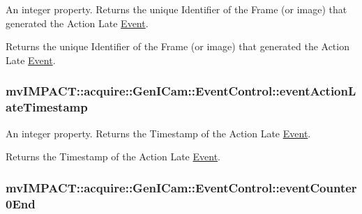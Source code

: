 An integer property. Returns the unique Identifier of the Frame (or image) that generated the Action Late \hyperlink{classmv_i_m_p_a_c_t_1_1acquire_1_1_event}{Event}. 

Returns the unique Identifier of the Frame (or image) that generated the Action Late \hyperlink{classmv_i_m_p_a_c_t_1_1acquire_1_1_event}{Event}. \hypertarget{classmv_i_m_p_a_c_t_1_1acquire_1_1_gen_i_cam_1_1_event_control_a7a4db5a663faf71da66e079f684392aa}{
\subsubsection[{event\+Action\+Late\+Timestamp}]{ mv\+I\+M\+P\+A\+C\+T\+::acquire\+::\+Gen\+I\+Cam\+::\+Event\+Control\+::event\+Action\+Late\+Timestamp}}\label{classmv_i_m_p_a_c_t_1_1acquire_1_1_gen_i_cam_1_1_event_control_a7a4db5a663faf71da66e079f684392aa}


An integer property. Returns the Timestamp of the Action Late \hyperlink{classmv_i_m_p_a_c_t_1_1acquire_1_1_event}{Event}. 

Returns the Timestamp of the Action Late \hyperlink{classmv_i_m_p_a_c_t_1_1acquire_1_1_event}{Event}. \hypertarget{classmv_i_m_p_a_c_t_1_1acquire_1_1_gen_i_cam_1_1_event_control_a12d4a0f273432ab029e5ddd9cc4e5586}{
\subsubsection[{event\+Counter0\+End}]{ mv\+I\+M\+P\+A\+C\+T\+::acquire\+::\+Gen\+I\+Cam\+::\+Event\+Control\+::event\+Counter0\+End}}\label{classmv_i_m_p_a_c_t_1_1acquire_1_1_gen_i_cam_1_1_event_control_a12d4a0f273432ab029e5ddd9cc4e5586}


